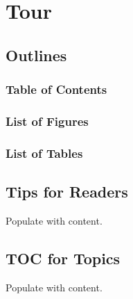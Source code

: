 
\section{Tour}
    \subsection{Outlines}
        \subsubsection{Table of Contents}
        \subsubsection{List of Figures}
        \subsubsection{List of Tables}
    \subsection{Tips for Readers}
       Populate with content.
    \subsection{TOC for Topics}
        Populate with content.